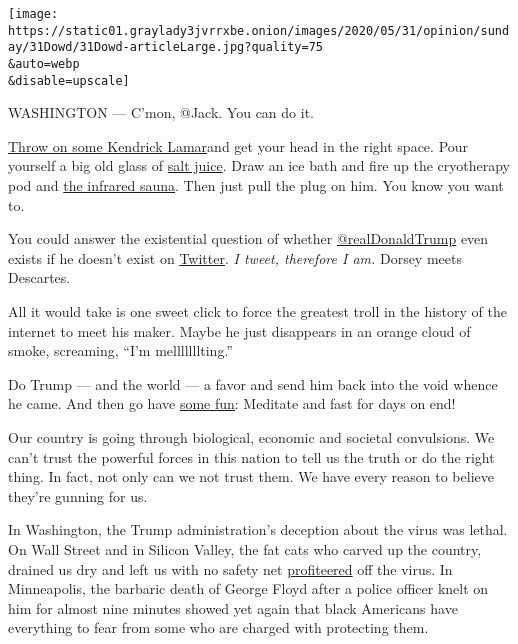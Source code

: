 \texttt{[image: https://static01.graylady3jvrrxbe.onion/images/2020/05/31/opinion/sunday/31Dowd/31Dowd-articleLarge.jpg?quality=75\\\&auto=webp\\\&disable=upscale]}

WASHINGTON --- C'mon, @Jack. You can do it.

\href{https://twitter.com/jack/status/630260438647898112?lang=en}{Throw
on some Kendrick Lamar}and get your head in the right space. Pour
yourself a big old glass of
\href{https://www.businessinsider.com/why-jack-dorsey-drinks-salt-juice-every-morning-2019-5}{salt
juice}. Draw an ice bath and fire up the cryotherapy pod and
\href{https://www.nytimes3xbfgragh.onion/2019/05/02/fashion/jack-dorsey-influencer.html}{the
infrared sauna}. Then just pull the plug on him. You know you want to.

You could answer the existential question of whether
\href{https://www.nytimes3xbfgragh.onion/2020/06/23/technology/trump-twitter-label-seattle.html}{@realDonaldTrump}
even exists if he doesn't exist on
\href{https://www.nytimes3xbfgragh.onion/2020/06/23/technology/trump-twitter-label-seattle.html}{Twitter}.
\emph{I tweet, therefore I am.} Dorsey meets Descartes.

All it would take is one sweet click to force the greatest troll in the
history of the internet to meet his maker. Maybe he just disappears in
an orange cloud of smoke, screaming, ``I'm melllllllting.''

Do Trump --- and the world --- a favor and send him back into the void
whence he came. And then go have
\href{https://twitter.com/jack/status/1071575088695140353?s=20}{some
fun}: Meditate and fast for days on end!

Our country is going through biological, economic and societal
convulsions. We can't trust the powerful forces in this nation to tell
us the truth or do the right thing. In fact, not only can we not trust
them. We have every reason to believe they're gunning for us.

In Washington, the Trump administration's deception about the virus was
lethal. On Wall Street and in Silicon Valley, the fat cats who carved up
the country, drained us dry and left us with no safety net
\href{https://www.cnn.com/2020/04/28/perspectives/inequality-coronavirus-billionaires/index.html}{profiteered}
off the virus. In Minneapolis, the barbaric death of George Floyd after
a police officer knelt on him for almost nine minutes showed yet again
that black Americans have everything to fear from some who are charged
with protecting them.

